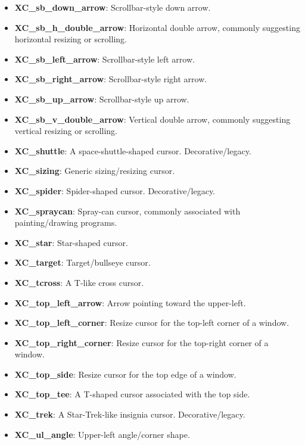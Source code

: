 \documentclass{report}
\begin{document}
\begin{itemize}
\begin{itemize}
                \item \textbf{XC\_sb\_down\_arrow}:	Scrollbar-style down arrow.
                \item \textbf{XC\_sb\_h\_double\_arrow}:	Horizontal double arrow, commonly suggesting horizontal resizing or scrolling.
                \item \textbf{XC\_sb\_left\_arrow}:	Scrollbar-style left arrow.
                \item \textbf{XC\_sb\_right\_arrow}:	Scrollbar-style right arrow.
                \item \textbf{XC\_sb\_up\_arrow}:	Scrollbar-style up arrow.
                \item \textbf{XC\_sb\_v\_double\_arrow}:	Vertical double arrow, commonly suggesting vertical resizing or scrolling.
                \item \textbf{XC\_shuttle}:	A space-shuttle-shaped cursor. Decorative/legacy.
                \item \textbf{XC\_sizing}:	Generic sizing/resizing cursor.
                \item \textbf{XC\_spider}:	Spider-shaped cursor. Decorative/legacy.
                \item \textbf{XC\_spraycan}:	Spray-can cursor, commonly associated with painting/drawing programs.
                \item \textbf{XC\_star}:	Star-shaped cursor.
                \item \textbf{XC\_target}:	Target/bullseye cursor.
                \item \textbf{XC\_tcross}:	A T-like cross cursor.
                \item \textbf{XC\_top\_left\_arrow}:	Arrow pointing toward the upper-left.
                \item \textbf{XC\_top\_left\_corner}:	Resize cursor for the top-left corner of a window.
                \item \textbf{XC\_top\_right\_corner}:	Resize cursor for the top-right corner of a window.
                \item \textbf{XC\_top\_side}:	Resize cursor for the top edge of a window.
                \item \textbf{XC\_top\_tee}:	A T-shaped cursor associated with the top side.
                \item \textbf{XC\_trek}:	A Star-Trek-like insignia cursor. Decorative/legacy.
                \item \textbf{XC\_ul\_angle}:	Upper-left angle/corner shape.

\end{itemize}
\end{itemize}
\end{document}
